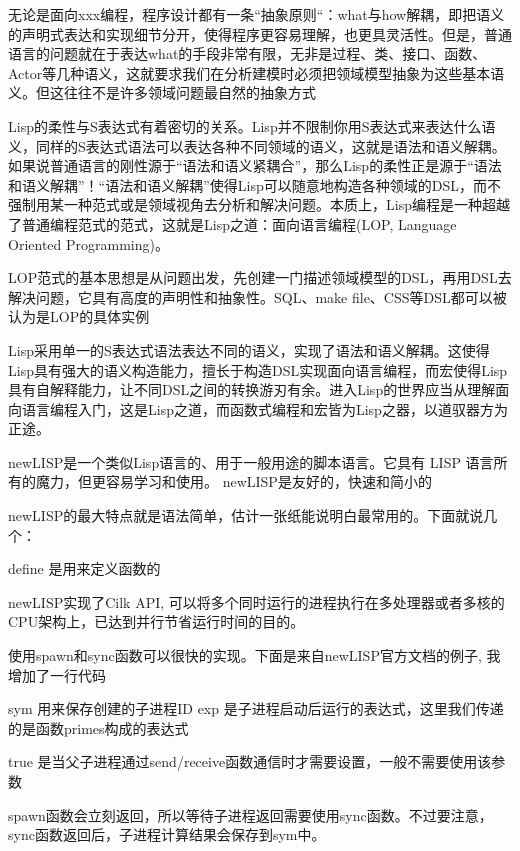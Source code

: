 \documentclass[cn,11pt]{elegantbook}
\begin{document}
无论是面向xxx编程，程序设计都有一条“抽象原则“：what与how解耦，即把语义的声明式表达和实现细节分开，使得程序更容易理解，也更具灵活性。但是，普通语言的问题就在于表达what的手段非常有限，无非是过程、类、接口、函数、Actor等几种语义，这就要求我们在分析建模时必须把领域模型抽象为这些基本语义。但这往往不是许多领域问题最自然的抽象方式

Lisp的柔性与S表达式有着密切的关系。Lisp并不限制你用S表达式来表达什么语义，同样的S表达式语法可以表达各种不同领域的语义，这就是语法和语义解耦。如果说普通语言的刚性源于“语法和语义紧耦合”，那么Lisp的柔性正是源于“语法和语义解耦”！“语法和语义解耦”使得Lisp可以随意地构造各种领域的DSL，而不强制用某一种范式或是领域视角去分析和解决问题。本质上，Lisp编程是一种超越了普通编程范式的范式，这就是Lisp之道：面向语言编程(LOP, Language Oriented Programming)。

LOP范式的基本思想是从问题出发，先创建一门描述领域模型的DSL，再用DSL去解决问题，它具有高度的声明性和抽象性。SQL、make file、CSS等DSL都可以被认为是LOP的具体实例

Lisp采用单一的S表达式语法表达不同的语义，实现了语法和语义解耦。这使得Lisp具有强大的语义构造能力，擅长于构造DSL实现面向语言编程，而宏使得Lisp具有自解释能力，让不同DSL之间的转换游刃有余。进入Lisp的世界应当从理解面向语言编程入门，这是Lisp之道，而函数式编程和宏皆为Lisp之器，以道驭器方为正途。

newLISP是一个类似Lisp语言的、用于一般用途的脚本语言。它具有 LISP 语言所有的魔力，但更容易学习和使用。
newLISP是友好的，快速和简小的

newLISP的最大特点就是语法简单，估计一张纸能说明白最常用的。下面就说几个：

define 是用来定义函数的

newLISP实现了Cilk API, 可以将多个同时运行的进程执行在多处理器或者多核的CPU架构上，已达到并行节省运行时间的目的。

使用spawn和sync函数可以很快的实现。下面是来自newLISP官方文档的例子, 我增加了一行代码

sym 用来保存创建的子进程ID
exp 是子进程启动后运行的表达式，这里我们传递的是函数primes构成的表达式

true 是当父子进程通过send/receive函数通信时才需要设置，一般不需要使用该参数

spawn函数会立刻返回，所以等待子进程返回需要使用sync函数。不过要注意，sync函数返回后，子进程计算结果会保存到sym中。
\end{document}
